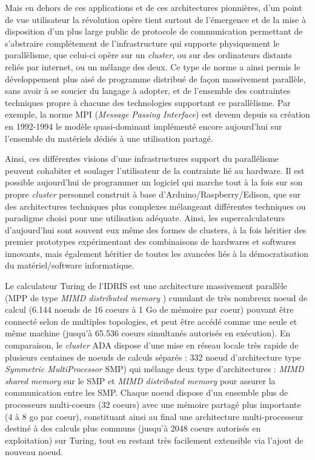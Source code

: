Mais en dehors de ces applications et de ces architectures pionnières, d’un point de vue utilisateur la révolution opère tient surtout de l’émergence et de la mise à disposition d’un plus large public de protocole de communication permettant de s’abstraire complétement de l’infrastructure qui supporte physiquement le parallèlisme, que celui-ci opère sur un \textit{cluster}, ou sur des ordinateurs distants reliés par internet, ou un mélange des deux. Ce type de norme a ainsi permis le développement plus aisé de programme distribué de façon massivement parallèle, sans avoir à se soucier du langage à adopter, et de l’ensemble des contraintes techniques propre à chacune des technologies supportant ce parallèlisme. Par exemple, la norme MPI (\textit{Message Passing Interface}) est devenu depuis sa création en 1992-1994 le modèle quasi-dominant implémenté encore aujourd’hui sur l’ensemble du matériels dédiés à une utilisation partagé.

Ainsi, ces différentes visions d'une infrastructures support du parallélisme peuvent cohabiter et soulager l'utilisateur de la contrainte lié au hardware. Il est possible aujourd'hui de programmer un logiciel qui marche tout à la fois sur son propre \textit{cluster} personnel construit à base d'Arduino/Raspberry/Edison, que sur des architectures techniques plus complexes mélangeant différentes techniques ou paradigme choisi pour une utilisation adéquate. Ainsi, les supercalculateurs d'aujourd'hui sont souvent eux même des formes de clusters, à la fois héritier des premier prototypes expérimentant des combinaisons de hardwares et softwares innovants, mais également héritier de toutes les avancées liés à la démocratisation du matériel/software informatique. 

Le calculateur Turing de l'IDRIS  est une architecture massivement parallèle (MPP de type \textit{MIMD distributed memory} \autocite{Snir2011}) cumulant de très nombreux noeud de calcul (6.144 noeuds de 16 coeurs à 1 Go de mémoire par coeur) pouvant être connecté selon de multiples topologies, et peut être accédé comme une seule et même machine (jusqu'à 65.536 coeurs simultanés autorisés en exécution). En comparaison, le \textit{cluster} ADA dispose d'une mise en réseau locale très rapide de plusieurs centaines de noeuds de calculs séparés : 332 noeud d'architecture type \textit{Symmetric MultiProcessor} SMP) qui mélange deux type d'architectures : \textit{MIMD shared memory} sur le SMP et \textit{MIMD distributed memory} pour assurer la communication entre les SMP. Chaque noeud dispose d'un ensemble plus de processeurs multi-coeurs (32 coeurs) avec une mémoire partagé plus importante (4 à 8 go par coeur), constituant ainsi au final une architecture multi-processeur destiné à des calculs plus communs (jusqu'à 2048 coeurs autorisés en exploitation) sur Turing, tout en restant très facilement extensible via l'ajout de nouveau noeud.

